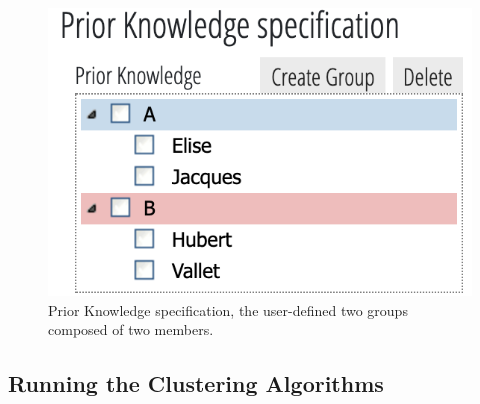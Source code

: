 \begin{figure}[!ht]
\centering
\includegraphics[trim={15 0 0 30}, clip, width=0.6\linewidth]{static/figures/PK-Clustering/VISPaperFigures/Small-PK_specification}
\caption{Prior Knowledge specification, the user-defined two groups composed of two members.}%
\label{fig:PK-Small-PK_specification}
\end{figure}

\subsection{Running the Clustering Algorithms} \label{sub:families}

